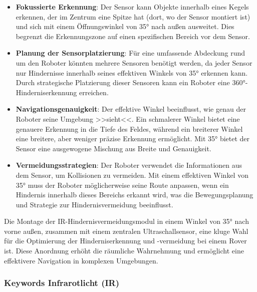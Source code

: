 \documentclass{vorlage-design-main}
\begin{document}
\begin{itemize}
\item
  \textbf{Fokussierte Erkennung}: Der Sensor kann Objekte innerhalb
  eines Kegels erkennen, der im Zentrum eine Spitze hat (dort, wo der
  Sensor montiert ist) und sich mit einem Öffnungswinkel von 35° nach
  außen ausweitet. Dies begrenzt die Erkennungszone auf einen
  spezifischen Bereich vor dem Sensor.
\item
  \textbf{Planung der Sensorplatzierung}: Für eine umfassende Abdeckung
  rund um den Roboter könnten mehrere Sensoren benötigt werden, da jeder
  Sensor nur Hindernisse innerhalb seines effektiven Winkels von 35°
  erkennen kann. Durch strategische Platzierung dieser Sensoren kann ein
  Roboter eine 360°-Hinderniserkennung erreichen.
\item
  \textbf{Navigationsgenauigkeit}: Der effektive Winkel beeinflusst, wie
  genau der Roboter seine Umgebung >>sieht<<. Ein schmalerer Winkel
  bietet eine genauere Erkennung in die Tiefe des Feldes, während ein
  breiterer Winkel eine breitere, aber weniger präzise Erkennung
  ermöglicht. Mit 35° bietet der Sensor eine ausgewogene Mischung aus
  Breite und Genauigkeit.
\item
  \textbf{Vermeidungsstrategien}: Der Roboter verwendet die
  Informationen aus dem Sensor, um Kollisionen zu vermeiden. Mit einem
  effektiven Winkel von 35° muss der Roboter möglicherweise seine Route
  anpassen, wenn ein Hindernis innerhalb dieses Bereichs erkannt wird,
  was die Bewegungsplanung und Strategie zur Hindernisvermeidung
  beeinflusst.
\end{itemize}

Die Montage der IR-Hindernisvermeidungsmodul in einem Winkel von 35°
nach vorne außen, zusammen mit einem zentralen Ultraschallsensor, eine
kluge Wahl für die Optimierung der Hinderniserkennung und -vermeidung
bei einem Rover ist. Diese Anordnung erhöht die räumliche Wahrnehmung
und ermöglicht eine effektivere Navigation in komplexen Umgebungen.

\hypertarget{keywords-infrarotlicht-ir}{%
\subsubsection{Keywords Infrarotlicht
(IR)}\label{keywords-infrarotlicht-ir}}
\end{document}
